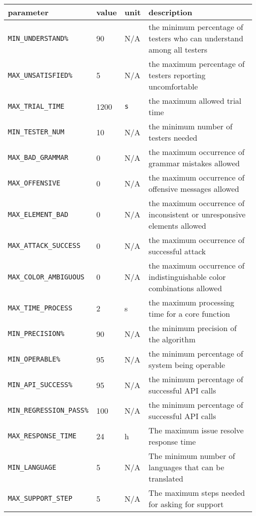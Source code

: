 \documentclass[12pt, titlepage]{article}
\begin{document}
\begin{longtable}{|l|l|l|p{5cm}|}

\hline
parameter & value & unit & description\\
\hline
\texttt{MIN\_UNDERSTAND\%}\label{MIN_UNDERSTAND} & 90 & N/A & the minimum percentage of testers who can understand among all testers\\
\hline
\texttt{MAX\_UNSATISFIED\%}\label{MAX_UNSATISFIED} & 5 & N/A & the maximum percentage of testers reporting uncomfortable\\
\hline
\texttt{MAX\_TRIAL\_TIME}\label{MAX_TRIAL_TIME} & 1200 & \texttt{s} & the maximum allowed trial time\\
\hline
\texttt{MIN\_TESTER\_NUM}\label{MIN_TESTER_NUM} &  10 & N/A & the minimum number of testers needed\\
\hline
\texttt{MAX\_BAD\_GRAMMAR}\label{MAX_BAD_GRAMMAR} & 0 & N/A & the maximum occurrence of grammar mistakes allowed \\
\hline
\texttt{MAX\_OFFENSIVE}\label{MAX_OFFENSIVE} & 0& N/A & the maximum occurrence of offensive messages allowed\\
\hline
\texttt{MAX\_ELEMENT\_BAD}\label{MAX_ELEMENT_BAD} & 0& N/A & the maximum occurrence of inconsistent 
 or unresponsive elements allowed\\
\hline
\texttt{MAX\_ATTACK\_SUCCESS}\label{MAX_ATTACK_SUCCESS} & 0& N/A & the maximum occurrence of successful attack\\
\hline
\texttt{MAX\_COLOR\_AMBIGUOUS}\label{MAX_COLOR_AMBIGUOUS} & 0& N/A & the maximum occurrence of indistinguishable color combinations allowed\\
\hline
\texttt{MAX\_TIME\_PROCESS}\label{MAX_TIME_PROCESS} & 2& s & the maximum processing time for a core function\\
\hline
\texttt{MIN\_PRECISION\%}\label{MIN_PRECISION} & 90 & N/A & the minimum precision of the algorithm\\
\hline
\texttt{MIN\_OPERABLE\%}\label{MIN_OPERABLE} & 95 & N/A & the minimum percentage of system being operable \\
\hline
\texttt{MIN\_API\_SUCCESS\%}\label{MIN_API_SUCCESS} & 95 & N/A &  the minimum percentage of successful API calls\\
\hline
\texttt{MIN\_REGRESSION\_PASS\%}\label{MIN_REGRESSION_PASS} & 100  & N/A &  the minimum percentage of successful API calls\\
\hline
\texttt{MAX\_RESPONSE\_TIME}\label{MAX_RESPONSE_TIME} & 24 & h & The maximum issue resolve response time\\
\hline
\texttt{MIN\_LANGUAGE}\label{MIN_LANGUAGE} & 5& N/A & The minimum number of languages that can be translated\\
\hline
\texttt{MAX\_SUPPORT\_STEP}\label{MAX_SUPPORT_STEP} & 5&N/A& The maximum steps needed for asking for support\\

\hline
\end{longtable}
\end{document}
